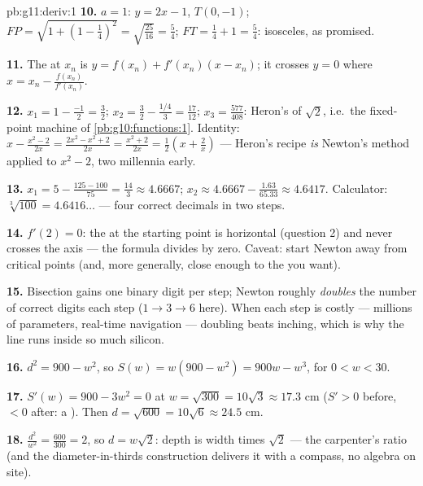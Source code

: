 \begin{solution}{pb:g11:deriv:1}
\textbf{10.} $a = 1$:  $y = 2x - 1$, $T(0, -1)$;
$FP = \sqrt{1 + \left(1 - \frac14\right)^2} =
\sqrt{\frac{25}{16}} = \frac54$; $FT = \frac14 + 1 = \frac54$:
isosceles, as promised.

\textbf{11.} The  at $x_n$ is
$y = f(x_n) + f'(x_n)(x - x_n)$; it crosses $y = 0$ where
$x = x_n - \frac{f(x_n)}{f'(x_n)}$.

\textbf{12.} $x_1 = 1 - \frac{-1}{2} = \frac32$;
$x_2 = \frac32 - \frac{1/4}{3} = \frac{17}{12}$;
$x_3 = \frac{577}{408}$: Heron's  of $\sqrt2$,
i.e.\ the fixed-point machine of \cref{pb:g10:functions:1}.
Identity: $x - \frac{x^2 - 2}{2x} = \frac{2x^2 - x^2 + 2}{2x}
= \frac{x^2 + 2}{2x} = \frac12\left(x + \frac2x\right)$ ---
Heron's recipe \emph{is} Newton's method applied to
$x^2 - 2$, two millennia early.

\textbf{13.} $x_1 = 5 - \frac{125 - 100}{75} = \frac{14}{3}
\approx 4.6667$; $x_2 \approx 4.6667 - \frac{1.63}{65.33}
\approx 4.6417$. Calculator: $\sqrt[3]{100} = 4.6416\ldots$ ---
four correct decimals in two steps.

\textbf{14.} $f'(2) = 0$: the  at the starting point is
horizontal (question 2) and never crosses the axis --- the
formula divides by zero. Caveat: start Newton away from
critical points (and, more generally, close enough to the 
you want).

\textbf{15.} Bisection gains one binary digit per step; Newton
roughly \emph{doubles} the number of correct digits each step
($1 \to 3 \to 6$ here). When each step is costly --- millions
of parameters, real-time navigation --- doubling beats
inching, which is why the  line runs inside so much
silicon.

\textbf{16.} $d^2 = 900 - w^2$, so
$S(w) = w(900 - w^2) = 900w - w^3$, for $0 < w < 30$.

\textbf{17.} $S'(w) = 900 - 3w^2 = 0$ at
$w = \sqrt{300} = 10\sqrt3 \approx 17.3$ cm ($S' > 0$ before,
$< 0$ after: a ). Then
$d = \sqrt{600} = 10\sqrt6 \approx 24.5$ cm.

\textbf{18.} $\frac{d^2}{w^2} = \frac{600}{300} = 2$, so
$d = w\sqrt2$: depth is width times $\sqrt2$ --- the
carpenter's ratio (and the diameter-in-thirds construction
delivers it with a compass, no algebra on site).


\end{solution}
